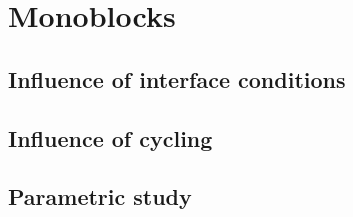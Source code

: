 \chapter{Monoblocks}
\section{Influence of interface conditions}

\section{Influence of cycling}
\section{Parametric study}

